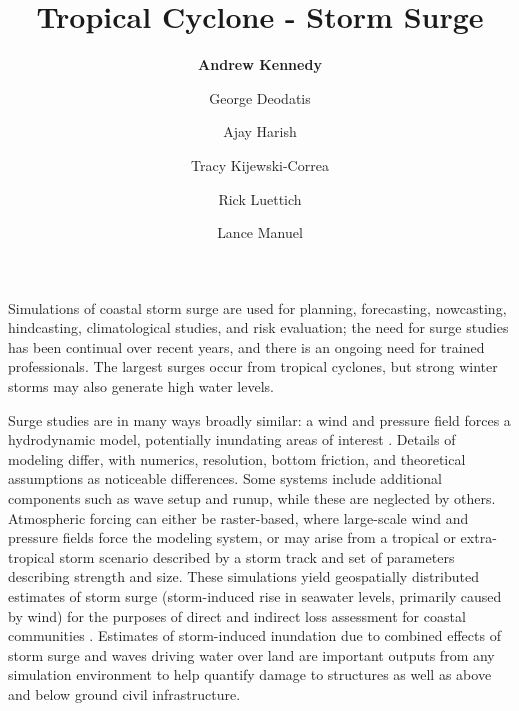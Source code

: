 %
%
%

\title{Tropical Cyclone - Storm Surge}
\author{
    \textbf{Andrew Kennedy}
    \and George Deodatis
    \and Ajay Harish
    \and Tracy Kijewski-Correa
    \and Rick Luettich
    \and Lance Manuel}
\tocauthor{}
%
%
\maketitle

Simulations of coastal storm surge are used for planning, forecasting, nowcasting, hindcasting, climatological studies, and risk evaluation; the need for surge studies has been continual over recent years, and there is an ongoing need for trained professionals. The largest surges occur from tropical cyclones, but strong winter storms may also generate high water levels.

Surge studies are in many ways broadly similar: a wind and pressure field forces a hydrodynamic model, potentially inundating areas of interest \citep{njcoast2018implementation}. Details of modeling differ, with numerics, resolution, bottom friction, and theoretical assumptions as noticeable differences. Some systems include additional components such as wave setup and runup, while these are neglected by others. Atmospheric forcing can either be raster-based, where large-scale wind and pressure fields force the modeling system, or may arise from a tropical or extra-tropical storm scenario described by a storm track and set of parameters describing strength and size. These simulations yield geospatially distributed estimates of storm surge (storm-induced rise in seawater levels, primarily caused by wind) for the purposes of direct and indirect loss assessment for coastal communities \citep{jacob2011responding}. Estimates of storm-induced inundation due to combined effects of storm surge and waves driving water over land are important outputs from any simulation environment to help quantify damage to structures as well as above and below ground civil infrastructure.

